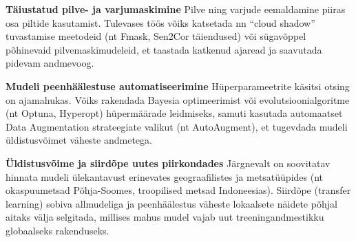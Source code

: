 \textbf{Täiustatud pilve- ja varjumaskimine} 
Pilve ning varjude eemaldamine piiras osa
piltide kasutamist. Tulevases töös võiks katsetada nn ``cloud shadow''
tuvastamise meetodeid (nt Fmask, Sen2Cor täiendused) või sügavõppel põhinevaid
pilvemaskimudeleid, et taastada katkenud ajaread ja saavutada pidevam andmevoog.

\textbf{Mudeli peenhäälestuse automatiseerimine} 
Hüperparameetrite käsitsi otsing on
ajamahukas. Võiks rakendada Bayesia optimeerimist või evolutsioonialgoritme (nt
Optuna, Hyperopt) hüpermäärade leidmiseks, samuti kasutada automaatset Data
Augmentation strateegiate valikut (nt AutoAugment), et tugevdada mudeli
üldistusvõimet väheste andmetega.

\textbf{Üldistusvõime ja siirdõpe uutes piirkondades} 
Järgnevalt on soovitatav hinnata
mudeli ülekantavust erinevates geograafilistes ja metsatüüpides (nt
okaspuumetsad Põhja-Soomes, troopilised metsad Indoneesias). Siirdõpe (transfer
learning) sobiva allmudeliga ja peenhäälestus väheste lokaalsete näidete põhjal
aitaks välja selgitada, millises mahus mudel vajab uut treeningandmestikku
globaalseks rakenduseks.